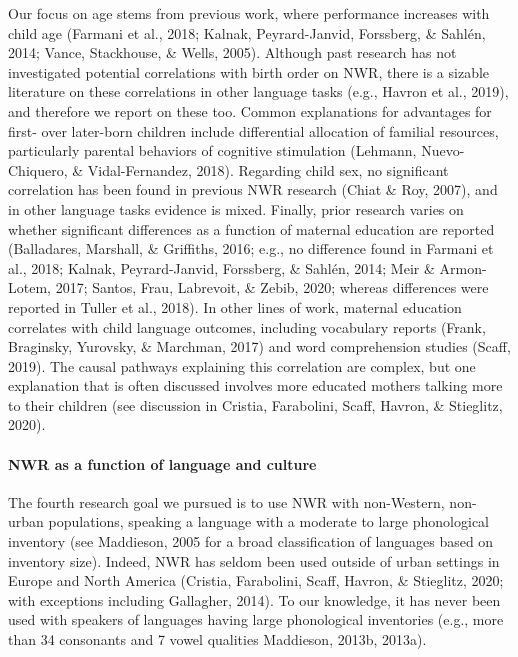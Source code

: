 \documentclass[
  english,
  ,man,floatsintext]{apa6}
\let\oldparagraph\paragraph
\renewcommand{\paragraph}[1]{\oldparagraph{#1}\mbox{}}
\begin{document}
Our focus on age stems from previous work, where performance increases with child age (Farmani et al., 2018; Kalnak, Peyrard-Janvid, Forssberg, \& Sahlén, 2014; Vance, Stackhouse, \& Wells, 2005). Although past research has not investigated potential correlations with birth order on NWR, there is a sizable literature on these correlations in other language tasks (e.g., Havron et al., 2019), and therefore we report on these too. Common explanations for advantages for first- over later-born children include differential allocation of familial resources, particularly parental behaviors of cognitive stimulation (Lehmann, Nuevo-Chiquero, \& Vidal-Fernandez, 2018). Regarding child sex, no significant correlation has been found in previous NWR research (Chiat \& Roy, 2007), and in other language tasks evidence is mixed. Finally, prior research varies on whether significant differences as a function of maternal education are reported (Balladares, Marshall, \& Griffiths, 2016; e.g., no difference found in Farmani et al., 2018; Kalnak, Peyrard-Janvid, Forssberg, \& Sahlén, 2014; Meir \& Armon-Lotem, 2017; Santos, Frau, Labrevoit, \& Zebib, 2020; whereas differences were reported in Tuller et al., 2018). In other lines of work, maternal education correlates with child language outcomes, including vocabulary reports (Frank, Braginsky, Yurovsky, \& Marchman, 2017) and word comprehension studies (Scaff, 2019). The causal pathways explaining this correlation are complex, but one explanation that is often discussed involves more educated mothers talking more to their children (see discussion in Cristia, Farabolini, Scaff, Havron, \& Stieglitz, 2020).

\hypertarget{nwr-as-a-function-of-language-and-culture}{%
\paragraph{NWR as a function of language and culture}\label{nwr-as-a-function-of-language-and-culture}}

The fourth research goal we pursued is to use NWR with non-Western, non-urban populations, speaking a language with a moderate to large phonological inventory (see Maddieson, 2005 for a broad classification of languages based on inventory size). Indeed, NWR has seldom been used outside of urban settings in Europe and North America (Cristia, Farabolini, Scaff, Havron, \& Stieglitz, 2020; with exceptions including Gallagher, 2014). To our knowledge, it has never been used with speakers of languages having large phonological inventories (e.g., more than 34 consonants and 7 vowel qualities Maddieson, 2013b, 2013a).
\end{document}
